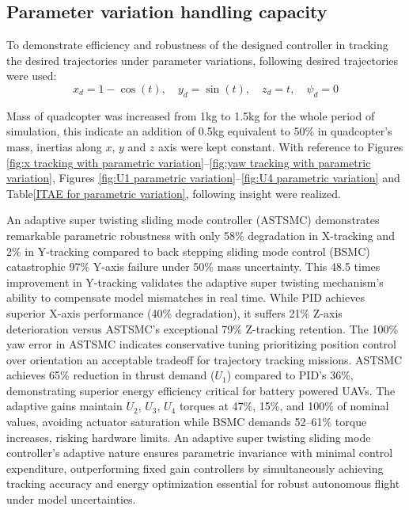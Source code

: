 \subsection{ Parameter variation handling capacity}

To demonstrate efficiency and robustness of the designed controller in tracking the desired trajectories 
under parameter variations, following desired trajectories were used:
\begin{equation}
x_d = 1 - \cos(t), \quad y_d = \sin(t), \quad z_d = t, \quad \psi_d = 0
\end{equation}

Mass of quadcopter was increased from 1kg to 1.5kg for the whole period of simulation, this indicate an 
addition of 0.5kg equivalent to 50\% in quadcopter’s mass, inertias along $x$, $y$ and $z$ axis were kept 
constant. With reference to Figures \ref{fig:x tracking with parametric variation}--\ref{fig:yaw tracking with parametric variation}, Figures \ref{fig:U1 parametric variation}--\ref{fig:U4 parametric variation} and Table\ref{ITAE for parametric variation}, following insight were realized.


An adaptive super twisting sliding mode controller (ASTSMC) demonstrates remarkable parametric robustness 
with only 58\% degradation in X-tracking and 2\% in Y-tracking compared to back stepping sliding mode 
control (BSMC) catastrophic 97\% Y-axis failure under 50\% mass uncertainty. This 48.5 times improvement 
in Y-tracking validates the adaptive super twisting mechanism's ability to compensate model mismatches 
in real time. While PID achieves superior X-axis performance (40\% degradation), it suffers 21\% Z-axis 
deterioration versus ASTSMC's exceptional 79\% Z-tracking retention. The 100\% yaw error in ASTSMC 
indicates conservative tuning prioritizing position control over orientation an acceptable tradeoff for 
trajectory tracking missions. ASTSMC achieves 65\% reduction in thrust demand ($U_1$) compared to PID's 
36\%, demonstrating superior energy efficiency critical for battery powered UAVs. The adaptive gains 
maintain $U_2$, $U_3$, $U_4$ torques at 47\%, 15\%, and 100\% of nominal values, avoiding actuator 
saturation while BSMC demands 52--61\% torque increases, risking hardware limits. An adaptive super 
twisting sliding mode controller’s adaptive nature ensures parametric invariance with minimal control 
expenditure, outperforming fixed gain controllers by simultaneously achieving tracking accuracy and 
energy optimization essential for robust autonomous flight under model uncertainties.

